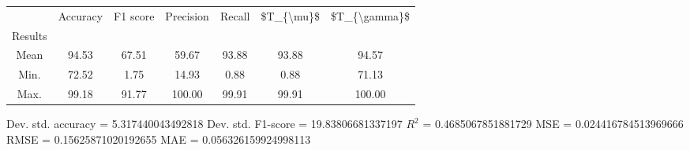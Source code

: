 \begin{tabular}{|c|c|c|c|c|c|c|}
\toprule
{} &  Accuracy &  F1 score &  Precision &  Recall &  \$T\_\{\textbackslash mu\}\$ &  \$T\_\{\textbackslash gamma\}\$ \\
Results &           &           &            &         &            &               \\
\hline
Mean    &     94.53 &     67.51 &      59.67 &   93.88 &      93.88 &         94.57 \\
Min.    &     72.52 &      1.75 &      14.93 &    0.88 &       0.88 &         71.13 \\
Max.    &     99.18 &     91.77 &     100.00 &   99.91 &      99.91 &        100.00 \\
\bottomrule
\end{tabular}

 Dev. std. accuracy = 5.317440043492818
 Dev. std. F1-score = 19.83806681337197
 $R^2$ = 0.4685067851881729
 MSE = 0.024416784513969666
 RMSE = 0.15625871020192655
 MAE = 0.056326159924998113